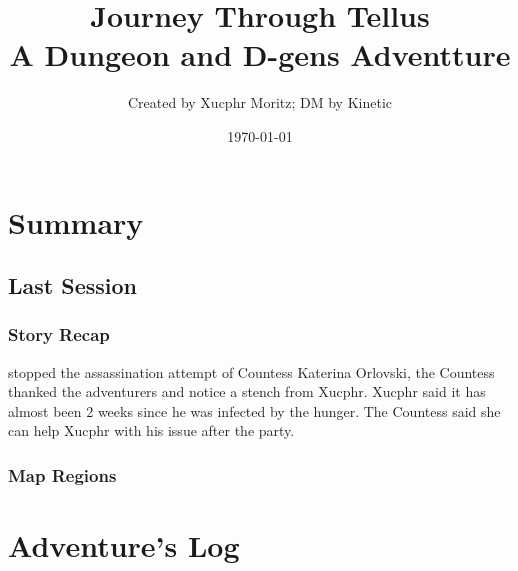 \documentclass[letterpaper,twocolumn,openany,nodeprecatedcode]{dndbook}
\title{Journey Through Tellus \\
\large A Dungeon and D-gens Adventture}
\author{Created by Xucphr Moritz; DM by Kinetic}
\date{\today}
\begin{document}
\frontmatter

\maketitle

\tableofcontents

\mainmatter%

\part{Summary}


\chapter*{Last Session}
\section{Story Recap}
 stopped the assassination attempt of Countess Katerina Orlovski, the Countess thanked the adventurers and notice a stench from Xucphr. Xucphr said it has almost been 2 weeks since he was infected by the hunger. The Countess said she can help Xucphr with his issue after the party.

\section{Map Regions}


\part{Adventure's Log}


%


%


%
\end{document}
